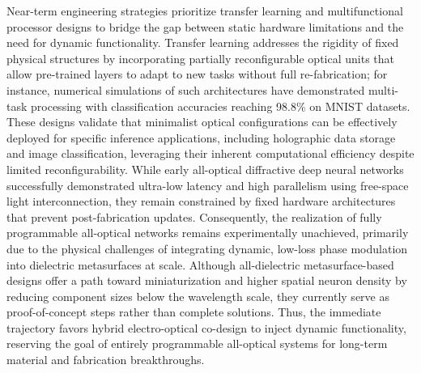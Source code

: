 \documentclass[11pt]{article}
\begin{document}
Near-term engineering strategies prioritize transfer learning and multifunctional processor designs to bridge the gap between static hardware limitations and the need for dynamic functionality. Transfer learning addresses the rigidity of fixed physical structures by incorporating partially reconfigurable optical units that allow pre-trained layers to adapt to new tasks without full re-fabrication; for instance, numerical simulations of such architectures have demonstrated multi-task processing with classification accuracies reaching 98.8\% on MNIST datasets. These designs validate that minimalist optical configurations can be effectively deployed for specific inference applications, including holographic data storage and image classification, leveraging their inherent computational efficiency despite limited reconfigurability. While early all-optical diffractive deep neural networks successfully demonstrated ultra-low latency and high parallelism using free-space light interconnection, they remain constrained by fixed hardware architectures that prevent post-fabrication updates. Consequently, the realization of fully programmable all-optical networks remains experimentally unachieved, primarily due to the physical challenges of integrating dynamic, low-loss phase modulation into dielectric metasurfaces at scale. Although all-dielectric metasurface-based designs offer a path toward miniaturization and higher spatial neuron density by reducing component sizes below the wavelength scale, they currently serve as proof-of-concept steps rather than complete solutions. Thus, the immediate trajectory favors hybrid electro-optical co-design to inject dynamic functionality, reserving the goal of entirely programmable all-optical systems for long-term material and fabrication breakthroughs. \citep{doi_10_1117_12_3109287_f4650a31} \citep{doi_10_3390_photonics11020145_68f5de58} \citep{doi_10_1364_josab_497148_b087424b} \citep{doi_10_1117_12_2688132_926a2697}
\end{document}
